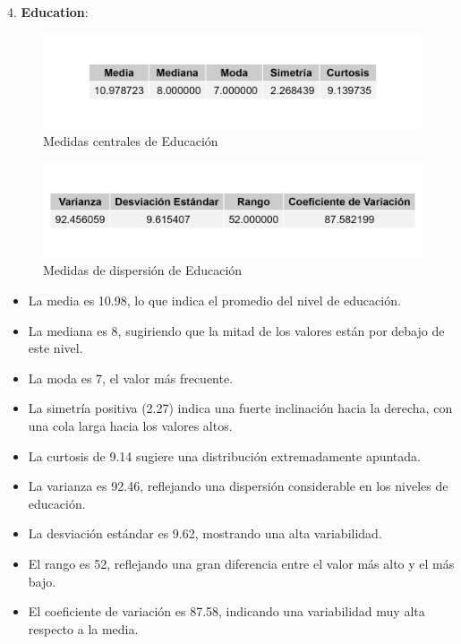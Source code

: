 \documentclass{article}
\begin{document}
4. \textbf{Education}:

   \begin{figure}[h!]
    \centering
    \includegraphics[width=\textwidth]{Swiss/Education_central.png}
    \caption{Medidas centrales de Educación}
\end{figure}

\begin{figure}[h!]
    \centering
    \includegraphics[width=\textwidth]{Swiss/Education_dispersion.png}
    \caption{Medidas de dispersión de Educación}
\end{figure}
   \begin{itemize}
       \item La media es 10.98, lo que indica el promedio del nivel de educación.
       \item La mediana es 8, sugiriendo que la mitad de los valores están por debajo de este nivel.
       \item La moda es 7, el valor más frecuente.
       \item La simetría positiva (2.27) indica una fuerte inclinación hacia la derecha, con una cola larga hacia los valores altos.
       \item La curtosis de 9.14 sugiere una distribución extremadamente apuntada.
       \item La varianza es 92.46, reflejando una dispersión considerable en los niveles de educación.
       \item La desviación estándar es 9.62, mostrando una alta variabilidad.
       \item El rango es 52, reflejando una gran diferencia entre el valor más alto y el más bajo.
       \item El coeficiente de variación es 87.58, indicando una variabilidad muy alta respecto a la media.
   \end{itemize}
\end{document}
